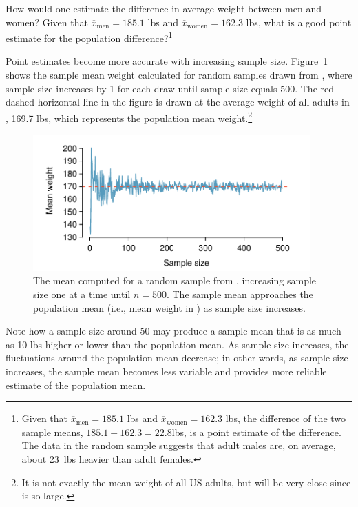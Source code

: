 \begin{exercise} \label{peOfDiffWeightBetweenGender}
	How would one estimate the difference in average weight between men and women? Given that $\overline{x}_{\text{men}} = 185.1$ lbs and $\overline{x}_{\text{women}} = 162.3$ lbs, what is a good point estimate for the population difference?\footnote{Given that $\overline{x}_{\text{men}} = 185.1$ lbs and $\overline{x}_{\text{women}} = 162.3$ lbs, the difference of the two sample means, $185.1 - 162.3 = 22.8$lbs, is a point estimate of the difference. The data in the random sample suggests that adult males are, on average, about 23~lbs heavier than adult females.}
\end{exercise}

Point estimates become more accurate with increasing sample size. Figure~\ref{cdcWeightRunningMean} shows the sample mean weight calculated for random samples drawn from , where sample size increases by 1 for each draw until sample size equals 500. The red dashed horizontal line in the figure is drawn at the average weight of all adults in , 169.7 lbs, which represents the population mean weight.\footnote{It is not exactly the mean weight of all US adults, but will be very close since  is so large.}

\begin{figure}[h]
	\centering
	\includegraphics[width=0.95\textwidth]{ch_inference_foundations_oi_biostat/figures/cdcWeightRunningMean/cdcWeightRunningMeanNew.pdf}
	\caption{The mean  computed for a random sample from , increasing sample size one at a time until $n = 500$. The sample mean approaches the population mean (i.e., mean weight in ) as sample size increases.}
	\label{cdcWeightRunningMean}
\end{figure}

Note how a sample size around 50 may produce a sample mean that is as much as 10 lbs higher or lower than the population mean. As sample size increases, the fluctuations around the population mean decrease; in other words, as sample size increases, the sample mean becomes less variable and provides more reliable estimate of the population mean.

